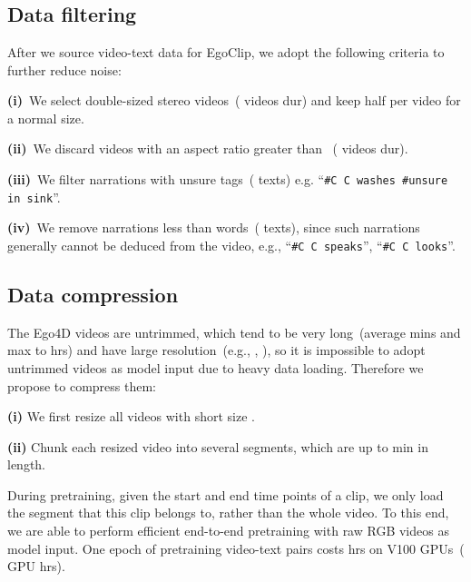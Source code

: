 \documentclass{article}
\newcommand{\dataset}{EgoClip}
\begin{document}
\section{\seca}\label{a}
\subsection{Data filtering}\label{a1}
After we source video-text data for \dataset, we adopt the following criteria to further reduce noise:

\textbf{(i)}~We select double-sized stereo videos~( videos dur) and keep half per video for a normal size. 


\textbf{(ii)}~We discard videos with an aspect ratio greater than ~( videos dur).


\textbf{(iii)}~We filter narrations with unsure tags~( texts) e.g. ``\texttt{\#C C washes \#unsure in sink}''.

\textbf{(iv)}~We remove narrations less than  words~( texts),
since such narrations generally cannot be deduced from the video, 
e.g., ``\texttt{\#C C speaks}'', ``\texttt{\#C C looks}''.



\subsection{Data compression}\label{a2}
The Ego4D videos are untrimmed, 
which tend to be very long~(average  mins and max to  hrs) and have large resolution~(e.g., , ),
so it is impossible to adopt untrimmed videos as model input due to heavy data loading. 
Therefore we propose to compress them:

\textbf{(i)} We first resize all videos with short size .

\textbf{(ii)} Chunk each resized video into several segments, which are up to  min in length.

During pretraining, given the start and end time points of a clip, we only load the segment that this clip belongs to, rather than the whole video. 
To this end, we are able to perform efficient end-to-end pretraining with raw RGB videos as model input. 
One epoch of pretraining  video-text pairs costs  hrs on  V100 GPUs~( GPU hrs).
\end{document}
